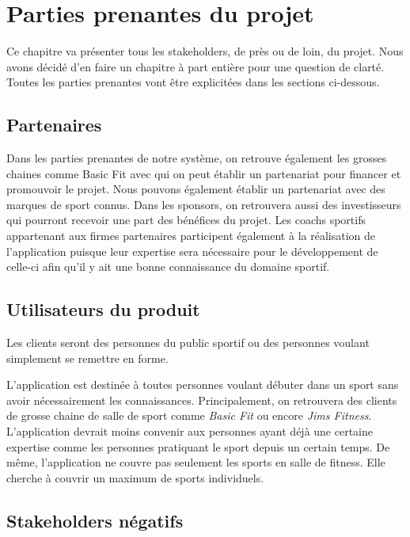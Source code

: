 \chapter{Parties prenantes du projet}

Ce chapitre va présenter tous les stakeholders, de près ou de loin, du projet. Nous avons décidé d'en faire un chapitre à part entière pour une question de clarté. Toutes les parties prenantes vont être explicitées dans les sections ci-dessous.

\section{Partenaires}

Dans les parties prenantes de notre système, on retrouve également les grosses chaines comme Basic Fit avec qui on peut établir un partenariat pour financer et promouvoir le projet. Nous pouvons également établir un partenariat avec des marques de sport connus. Dans les sponsors, on retrouvera aussi  des investisseurs qui pourront recevoir une part des bénéfices du projet. Les coachs sportifs appartenant aux firmes partenaires participent également à la réalisation de l'application puisque leur expertise sera nécessaire pour le développement de celle-ci afin qu'il y ait une bonne connaissance du domaine sportif.

\section{Utilisateurs du produit}

Les clients seront des personnes du public sportif ou des personnes voulant simplement se remettre en forme. 

L'application est destinée à toutes personnes voulant débuter dans un sport sans avoir nécessairement les connaissances. Principalement, on retrouvera des clients de grosse chaine de salle de sport comme \textit{Basic Fit} ou encore \textit{Jims Fitness}. L'application devrait moins convenir aux personnes ayant déjà une certaine expertise comme les personnes pratiquant le sport depuis un certain temps. De même, l'application ne couvre pas seulement les sports en salle de fitness. Elle cherche à couvrir un maximum de sports individuels.

\section{Stakeholders négatifs}

